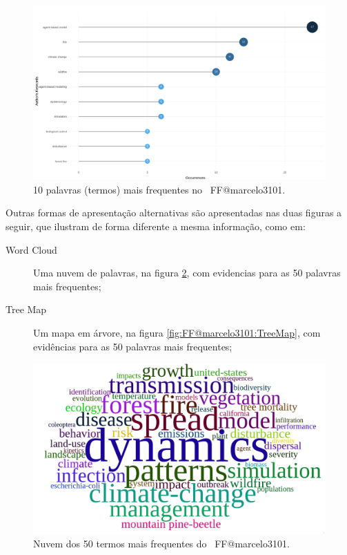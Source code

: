 \begin{figure}
    \centering
    \includegraphics[width=1\textwidth]{exploratory-data-analysis/marcelo3101/PesqBibliogr/ForestFire/WoS-20221204/assets/MostFrequentWordsFFmarcelo3101.png}
    \caption{10 palavras (termos) mais frequentes no \dataset\ FF@marcelo3101.}
    \label{fig:FF@marcelo3101:Word:Occurrences}
\end{figure}

Outras formas de apresentação alternativas são apresentadas nas duas figuras a seguir, que ilustram de forma diferente a mesma informação, como em:
\begin{description}
    \item [Word Cloud] Uma nuvem de palavras, na figura \ref{fig:FF@marcelo3101:WordCloud-100words}, com evidencias para as 50 palavras mais frequentes;
    \item [Tree Map] Um mapa em árvore, na figura \ref{fig:FF@marcelo3101:TreeMap}, com evidências para as 50 palavras mais frequentes;
\end{description}

\begin{figure}
    \centering
    \includegraphics[width=1\textwidth]{exploratory-data-analysis/marcelo3101/PesqBibliogr/ForestFire/WoS-20221204/assets/WordCloudFFmarcelo3101.png}
    \caption{Nuvem dos 50 termos mais frequentes do \dataset\ FF@marcelo3101.}
    \label{fig:FF@marcelo3101:WordCloud-100words}
\end{figure}

